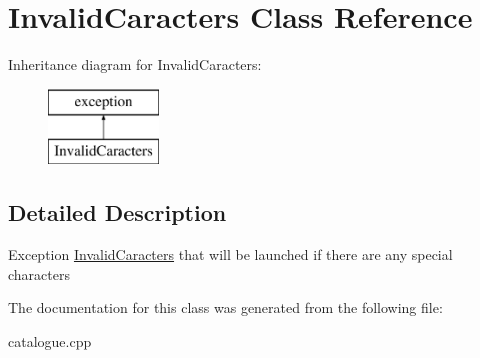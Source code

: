 \hypertarget{classInvalidCaracters}{\section{Invalid\-Caracters Class Reference}
\label{classInvalidCaracters}
}
Inheritance diagram for Invalid\-Caracters\-:\begin{figure}[H]
\begin{center}
\leavevmode
\includegraphics[height=2.000000cm]{classInvalidCaracters}
\end{center}
\end{figure}


\subsection{Detailed Description}
Exception \hyperlink{classInvalidCaracters}{Invalid\-Caracters} that will be launched if there are any special characters 

The documentation for this class was generated from the following file\-:\begin{DoxyCompactItemize}
\item 
catalogue.\-cpp\end{DoxyCompactItemize}
